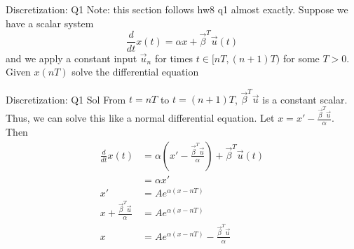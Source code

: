 \documentclass{beamer}
\begin{document}
	\begin{frame}{Discretization: Q1}
	Note: this section follows hw8 q1 almost exactly. Suppose we have a scalar system
	\[ \frac{d}{dt} x(t) = \alpha x + \vec{\beta}^T \vec u(t) \]
	and we apply a constant input $\vec{u}_n$ for times $t \in [nT, (n + 1)T)$ for some $T > 0$. Given $x(nT)$ solve the differential equation
	\end{frame}\begin{frame}{Discretization: Q1 Sol}
	From $t = nT$ to $t = (n + 1)T$, $\vec{\beta}^T \vec{u}$ is a constant scalar. Thus, we can solve this like a normal differential equation. Let $x = x' - \frac{\vec \beta^T \vec u}{\alpha}$. Then
	\begin{align*}
	\frac{d}{dt} x(t) &= \alpha (x' - \frac{\vec \beta^T \vec u}{\alpha}) + \vec{\beta}^T \vec u(t) \\
	&= \alpha x' \\
	x' &= A e^{\alpha (x - nT)} \\
	x + \frac{\vec \beta^T \vec u}{\alpha} &= A e^{\alpha (x - nT)} \\
	x &= A e^{\alpha (x - nT)} - \frac{\vec \beta^T \vec u}{\alpha}
	\end{align*}
\end{frame}
\end{document}
